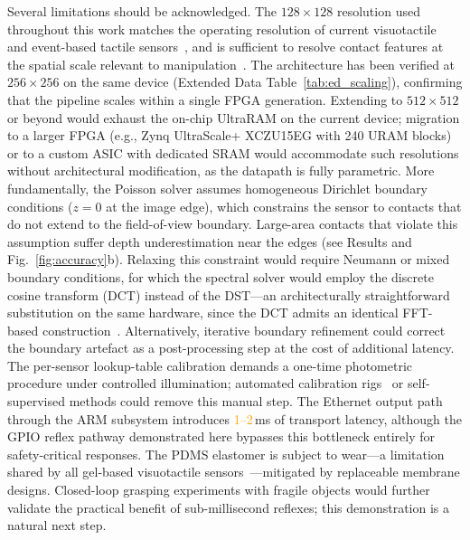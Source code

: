 \documentclass[10pt,a4paper]{article}
\newcommand{\placeholder}[1]{\textcolor{orange}{#1}}
\begin{document}
Several limitations should be acknowledged. The $128 \times 128$ resolution used throughout this work matches the operating resolution of current visuotactile~\cite{yuan2017gelsight,lambeta2020digit} and event-based tactile sensors~\cite{jiang2026spikingtac}, and is sufficient to resolve contact features at the spatial scale relevant to manipulation~\cite{yuan2017gelsight}. The architecture has been verified at $256 \times 256$ on the same device (Extended Data Table~\ref{tab:ed_scaling}), confirming that the pipeline scales within a single FPGA generation. Extending to $512 \times 512$ or beyond would exhaust the on-chip UltraRAM on the current device; migration to a larger FPGA (e.g., Zynq UltraScale+ XCZU15EG with 240 URAM blocks) or to a custom ASIC with dedicated SRAM would accommodate such resolutions without architectural modification, as the datapath is fully parametric. More fundamentally, the Poisson solver assumes homogeneous Dirichlet boundary conditions ($z = 0$ at the image edge), which constrains the sensor to contacts that do not extend to the field-of-view boundary. Large-area contacts that violate this assumption suffer depth underestimation near the edges (see Results and Fig.~\ref{fig:accuracy}b). Relaxing this constraint would require Neumann or mixed boundary conditions, for which the spectral solver would employ the discrete cosine transform (DCT) instead of the DST---an architecturally straightforward substitution on the same hardware, since the DCT admits an identical FFT-based construction~\cite{makhoul1980fct}. Alternatively, iterative boundary refinement could correct the boundary artefact as a post-processing step at the cost of additional latency. The per-sensor lookup-table calibration demands a one-time photometric procedure under controlled illumination; automated calibration rigs~\cite{yuan2017gelsight} or self-supervised methods could remove this manual step. The Ethernet output path through the ARM subsystem introduces \placeholder{1--2}\,ms of transport latency, although the GPIO reflex pathway demonstrated here bypasses this bottleneck entirely for safety-critical responses. The PDMS elastomer is subject to wear---a limitation shared by all gel-based visuotactile sensors~\cite{lambeta2020digit,taylor2022gelslim3}---mitigated by replaceable membrane designs. Closed-loop grasping experiments with fragile objects would further validate the practical benefit of sub-millisecond reflexes; this demonstration is a natural next step.
\end{document}
